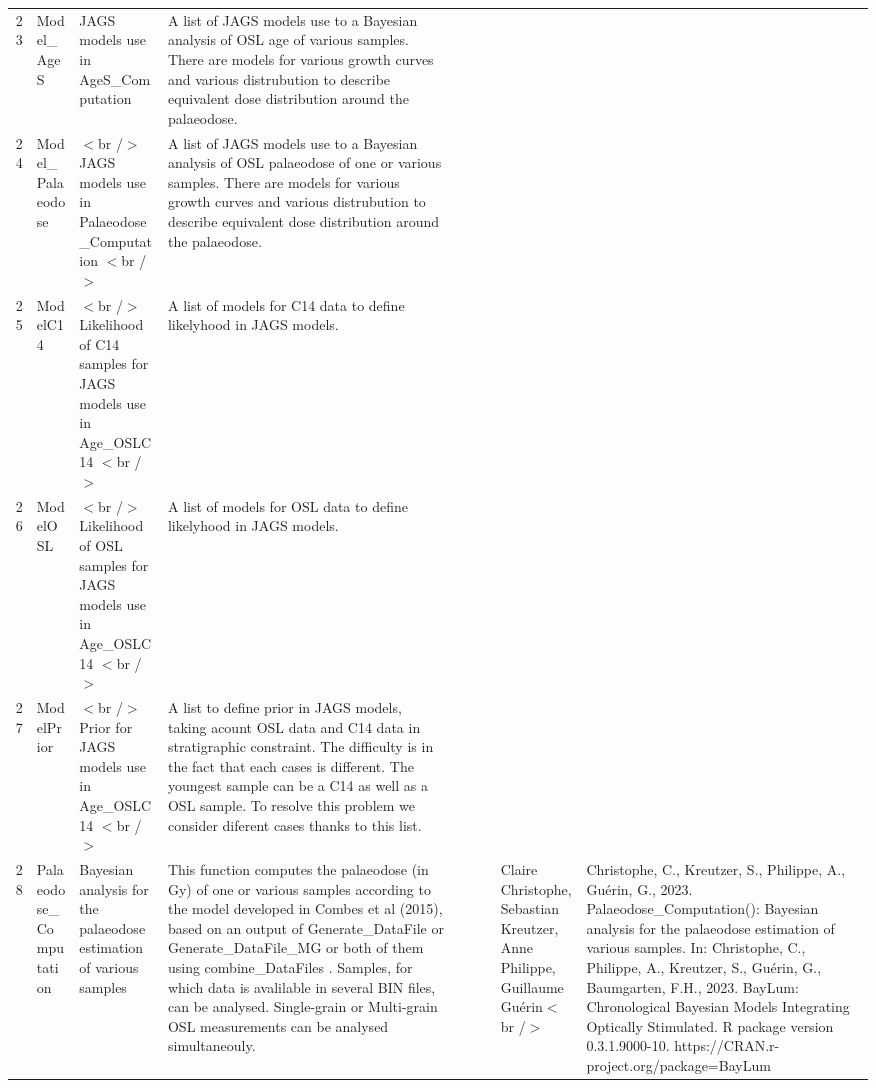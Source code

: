 \begin{table}[ht]
\begin{tabular}{rllllllll}
  23 & Model\_AgeS & JAGS models use in  AgeS\_Computation & A list of JAGS models use to a Bayesian analysis of OSL age of various samples. There are models for various growth curves and various distrubution to describe equivalent dose distribution around the palaeodose. &  &  &  &  &  \\ 
  24 & Model\_Palaeodose & $<$br /$>$ JAGS models use in  Palaeodose\_Computation $<$br /$>$ & A list of JAGS models use to a Bayesian analysis of OSL palaeodose of one or various samples. There are models for various growth curves and various distrubution to describe equivalent dose distribution around the palaeodose. &  &  &  &  &  \\ 
  25 & ModelC14 & $<$br /$>$ Likelihood of C14 samples for JAGS models use in  Age\_OSLC14 $<$br /$>$ & A list of models for C14 data to define likelyhood in JAGS models. &  &  &  &  &  \\ 
  26 & ModelOSL & $<$br /$>$ Likelihood of OSL samples for JAGS models use in  Age\_OSLC14 $<$br /$>$ & A list of models for OSL data to define likelyhood in JAGS models. &  &  &  &  &  \\ 
  27 & ModelPrior & $<$br /$>$ Prior for JAGS models use in  Age\_OSLC14 $<$br /$>$ & A list to define prior in JAGS models, taking acount OSL data and C14 data in stratigraphic constraint. The difficulty is in the fact that each cases is different. The youngest sample can be a C14 as well as a OSL sample. To resolve this problem we consider diferent cases thanks to this list. &  &  &  &  &  \\ 
  28 & Palaeodose\_Computation & Bayesian analysis for the palaeodose estimation of various samples & This function computes the palaeodose (in Gy) of one or various samples according to the model developed in Combes et al (2015), based on an output of  Generate\_DataFile  or  Generate\_DataFile\_MG  or both of them using  combine\_DataFiles .  Samples, for which data is avalilable in several BIN files, can be analysed.  Single-grain or Multi-grain OSL measurements can be analysed simultaneouly. &  &  &  & Claire Christophe, Sebastian Kreutzer, Anne Philippe, Guillaume Guérin$<$br /$>$ & Christophe, C., Kreutzer, S., Philippe, A., Guérin, G., 2023. Palaeodose\_Computation(): Bayesian analysis for the palaeodose estimation of various samples. In: Christophe, C., Philippe, A., Kreutzer, S., Guérin, G., Baumgarten, F.H., 2023. BayLum: Chronological Bayesian Models Integrating Optically Stimulated. R package version 0.3.1.9000-10. https://CRAN.r-project.org/package=BayLum
 \\ 

\end{tabular}
\end{table}
